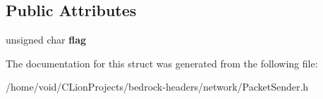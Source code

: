 \subsection*{Public Attributes}
\begin{DoxyCompactItemize}
\item 
\mbox{\label{struct_packet_sender_a23f1ea95e73a75b8a451e886e216e838}} 
unsigned char {\bfseries flag}
\end{DoxyCompactItemize}


The documentation for this struct was generated from the following file\+:\begin{DoxyCompactItemize}
\item 
/home/void/\+C\+Lion\+Projects/bedrock-\/headers/network/Packet\+Sender.\+h\end{DoxyCompactItemize}
